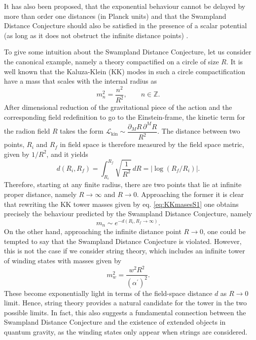 \documentclass[11pt,a4paper]{article}
\begin{document}
It has also been proposed, that the exponential behaviour cannot be delayed by more than order one distances (in Planck units) and that the Swampland Distance Conjecture should also be satisfied in the presence of a scalar potential (as long as it does not obstruct the infinite distance points) \cite{Baume:2016, Klaewer:2016kiy}.

To give some intuition about the Swampland Distance Conjecture, let us consider the canonical example, namely a theory compactified on a circle of size $R$. It is well known that the Kaluza-Klein (KK) modes in such a circle compactification have a mass that scales with the internal radius as
\begin{equation}
\label{eq:KKmasesS1}
m_{n}^2=\dfrac{n^2}{R^2}, \qquad n \in \mathbb{Z}.
\end{equation}
After dimensional reduction of the gravitational piece of the action and the corresponding  field redefinition to go to the Einstein-frame, the kinetic term for the radion field $R$ takes the form $\mathcal{L}_{\mathrm{kin}}\sim \dfrac{\partial_M R \, \partial^MR}{R^{2}}$.
The distance between two points, $R_i$ and $R_f$  in field space is therefore measured by the field space metric, given by $1/R^2$, and it yields
\begin{equation}
d(R_i, R_f)=\int_{R_i}^{R_f} \sqrt{\dfrac{1}{R^2}}\, dR= \left|\log (R_f/R_i) \right|.
\end{equation}
Therefore, starting at any finite radius, there are two points that lie at infinite proper distance, namely $R\rightarrow \infty$ and $R\rightarrow 0$. Approaching the former it is clear that rewriting the KK tower masses given by eq. \eqref{eq:KKmasesS1} one obtains precisely the behaviour predicted by the Swampland Distance Conjecture, namely
\begin{equation}
m_{n}\sim e^{-d(R_i, R_f\rightarrow \infty)}.
\end{equation} 
On the other hand, approaching the infinite distance point $R\rightarrow 0$, one could be tempted to say that the Swampland Distance Conjecture is violated. However, this is not the case if we consider string theory, which includes an infinite tower of winding states with masses given by
\begin{equation}
m_{w}^2=\dfrac{w^2R^2}{(\alpha^\prime)^2}.
\end{equation}
These  become exponentially light in terms of the field-space distance $d$ as $R\rightarrow 0$ limit. Hence, string theory provides a natural candidate for the tower in the two possible limits. In fact, this also suggests a fundamental connection between the Swampland Distance Conjecture and the existence of extended objects in quantum gravity, as the winding states only appear when strings are considered. 
\end{document}
